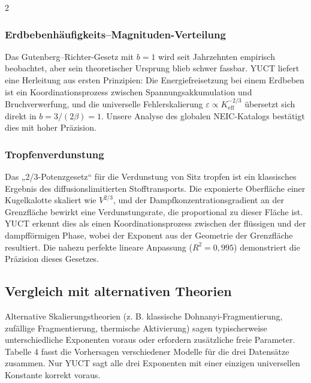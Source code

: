 \documentclass[11pt,a4paper]{article}
\newcommand{\eps}{\varepsilon}
\newcommand{\Keff}{K_{\mathrm{eff}}}
\newcommand{\betaf}{\beta}
\begin{document}
\begin{multicols}{2}
		\subsubsection{Erdbebenhäufigkeits–Magnituden-Verteilung}
		Das Gutenberg–Richter-Gesetz mit \(b = 1\) wird seit Jahrzehnten empirisch beobachtet, aber sein theoretischer Ursprung blieb schwer fassbar. YUCT liefert eine Herleitung aus ersten Prinzipien: Die Energiefreisetzung bei einem Erdbeben ist ein Koordinationsprozess zwischen Spannungsakkumulation und Bruchverwerfung, und die universelle Fehlerskalierung \(\eps \propto \Keff^{-2/3}\) übersetzt sich direkt in \(b = 3/(2\betaf) = 1\). Unsere Analyse des globalen NEIC-Katalogs bestätigt dies mit hoher Präzision.
		
		\subsubsection{Tropfenverdunstung}
		Das „2/3-Potenzgesetz“ für die Verdunstung von Sitz tropfen ist ein klassisches Ergebnis des diffusionslimitierten Stofftransports. Die exponierte Oberfläche einer Kugelkalotte skaliert wie \(V^{2/3}\), und der Dampfkonzentrationsgradient an der Grenzfläche bewirkt eine Verdunstungsrate, die proportional zu dieser Fläche ist. YUCT erkennt dies als einen Koordinationsprozess zwischen der flüssigen und der dampfförmigen Phase, wobei der Exponent aus der Geometrie der Grenzfläche resultiert. Die nahezu perfekte lineare Anpassung (\(R^2 = 0,995\)) demonstriert die Präzision dieses Gesetzes.
		
		\subsection{Vergleich mit alternativen Theorien}
		
		Alternative Skalierungstheorien (z. B. klassische Dohnanyi-Fragmentierung, zufällige Fragmentierung, thermische Aktivierung) sagen typischerweise unterschiedliche Exponenten voraus oder erfordern zusätzliche freie Parameter. Tabelle 4 fasst die Vorhersagen verschiedener Modelle für die drei Datensätze zusammen. Nur YUCT sagt alle drei Exponenten mit einer einzigen universellen Konstante korrekt voraus.
		

\end{multicols}
\end{document}
